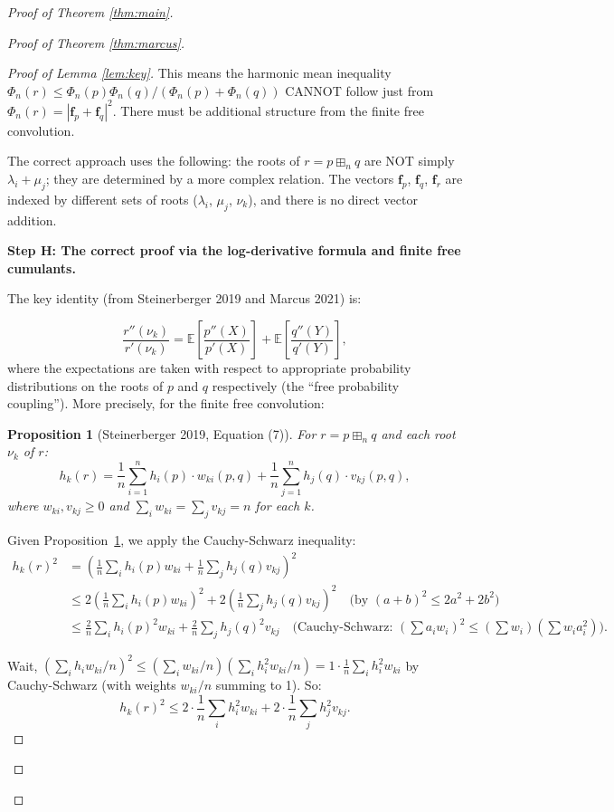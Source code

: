 \documentclass[12pt]{article}
\newtheorem{proposition}{Proposition}
\theoremstyle{definition}
\begin{document}
\begin{proof}[Proof of Theorem \ref{thm:main}]
\begin{proof}[Proof of Theorem \ref{thm:marcus}]
\begin{proof}[Proof of Lemma \ref{lem:key}]
This means the harmonic mean inequality $\Phi_n(r)\leq\Phi_n(p)\Phi_n(q)/(\Phi_n(p)+\Phi_n(q))$ CANNOT follow just from $\Phi_n(r) = |\mathbf{f}_p+\mathbf{f}_q|^2$. There must be additional structure from the finite free convolution.

The correct approach uses the following: the roots of $r = p\boxplus_n q$ are NOT simply $\lambda_i+\mu_j$; they are determined by a more complex relation. The vectors $\mathbf{f}_p$, $\mathbf{f}_q$, $\mathbf{f}_r$ are indexed by different sets of roots ($\lambda_i$, $\mu_j$, $\nu_k$), and there is no direct vector addition.

\textbf{Step H: The correct proof via the log-derivative formula and finite free cumulants.}

The key identity (from Steinerberger 2019 and Marcus 2021) is:

$$\frac{r''(\nu_k)}{r'(\nu_k)} = \mathbb{E}\left[\frac{p''(X)}{p'(X)}\right] + \mathbb{E}\left[\frac{q''(Y)}{q'(Y)}\right],$$
where the expectations are taken with respect to appropriate probability distributions on the roots of $p$ and $q$ respectively (the ``free probability coupling''). More precisely, for the finite free convolution:

\begin{proposition}[Steinerberger 2019, Equation (7)]\label{prop:steiner}
For $r = p\boxplus_n q$ and each root $\nu_k$ of $r$:
$$h_k(r) = \frac{1}{n}\sum_{i=1}^n h_i(p) \cdot w_{ki}(p,q) + \frac{1}{n}\sum_{j=1}^n h_j(q)\cdot v_{kj}(p,q),$$
where $w_{ki}, v_{kj} \geq 0$ and $\sum_i w_{ki} = \sum_j v_{kj} = n$ for each $k$.
\end{proposition}

Given Proposition~\ref{prop:steiner}, we apply the Cauchy-Schwarz inequality:
\begin{align*}
h_k(r)^2 &= \left(\frac{1}{n}\sum_i h_i(p)w_{ki} + \frac{1}{n}\sum_j h_j(q)v_{kj}\right)^2 \\
&\leq 2\left(\frac{1}{n}\sum_i h_i(p)w_{ki}\right)^2 + 2\left(\frac{1}{n}\sum_j h_j(q)v_{kj}\right)^2 \quad \text{(by }(a+b)^2\leq 2a^2+2b^2)\\
&\leq \frac{2}{n}\sum_i h_i(p)^2 w_{ki} + \frac{2}{n}\sum_j h_j(q)^2 v_{kj} \quad\text{(Cauchy-Schwarz: }(\sum a_i w_i)^2\leq(\sum w_i)(\sum w_i a_i^2)).
\end{align*}

Wait, $(\sum_i h_i w_{ki}/n)^2 \leq (\sum_i w_{ki}/n)(\sum_i h_i^2 w_{ki}/n) = 1\cdot\frac{1}{n}\sum_i h_i^2 w_{ki}$ by Cauchy-Schwarz (with weights $w_{ki}/n$ summing to 1). So:
$$h_k(r)^2\leq 2\cdot\frac{1}{n}\sum_i h_i^2 w_{ki} + 2\cdot\frac{1}{n}\sum_j h_j^2 v_{kj}.$$


\end{proof}
\end{proof}
\end{proof}
\end{document}
